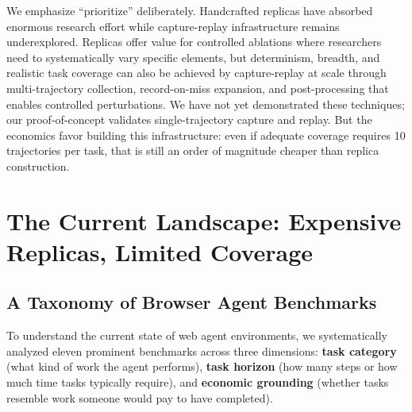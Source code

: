 \documentclass[letterpaper]{article}
\begin{document}
We emphasize ``prioritize'' deliberately. Handcrafted replicas have absorbed enormous research effort while capture-replay infrastructure remains underexplored. Replicas offer value for controlled ablations where researchers need to systematically vary specific elements, but determinism, breadth, and realistic task coverage can also be achieved by capture-replay at scale through multi-trajectory collection, record-on-miss expansion, and post-processing that enables controlled perturbations. We have not yet demonstrated these techniques; our proof-of-concept validates single-trajectory capture and replay. But the economics favor building this infrastructure: even if adequate coverage requires 10 trajectories per task, that is still an order of magnitude cheaper than replica construction.



\section{The Current Landscape: Expensive Replicas, Limited Coverage}
\label{sec:landscape}

\subsection{A Taxonomy of Browser Agent Benchmarks}

To understand the current state of web agent environments, we systematically analyzed eleven prominent benchmarks across three dimensions: \textbf{task category} (what kind of work the agent performs), \textbf{task horizon} (how many steps or how much time tasks typically require), and \textbf{economic grounding} (whether tasks resemble work someone would pay to have completed).
\end{document}
